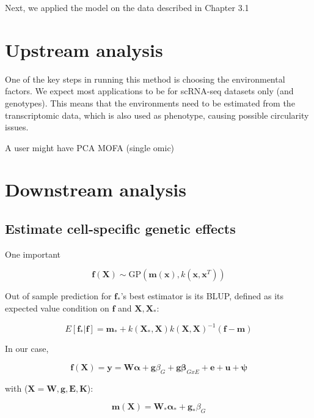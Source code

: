 Next, we applied the model on the data described in Chapter 3.1

\section{Upstream analysis}

One of the key steps in running this method is choosing the environmental factors.
We expect most applications to be for scRNA-seq datasets only (and genotypes).
This means that the environments need to be estimated from the transcriptomic data, which is also used as phenotype, causing possible circularity issues.


A user might have 
PCA
MOFA (single omic)

\section{Downstream analysis} 

\subsection{Estimate cell-specific genetic effects}
One important 

\begin{equation}
    \mathbf{f}(\mathbf{X}) \sim \mathrm{GP}(\mathbf{m}(\mathbf{x}), k(\mathbf{x},\mathbf{x}^T))
\end{equation}

Out of sample prediction for $\mathbf{f}_*$'s best estimator is its BLUP, defined as its expected value condition on $\mathbf{f}$ and $\mathbf{X},\mathbf{X}_*$:

\begin{equation}
    E[\mathbf{f}_*|\mathbf{f}] = \mathbf{m}_* +k(\mathbf{X}_*,\mathbf{X})k(\mathbf{X},\mathbf{X})^{-1}(\mathbf{f}-\mathbf{m})
\end{equation}

In our case,

\begin{equation}
    \mathbf{f}(\mathbf{X}) = \mathbf{y} = \mathbf{W}\boldsymbol{\alpha}+\mathbf{g}\beta_G+\mathbf{g}\boldsymbol{\beta}_{GxE}+\mathbf{e} + \mathbf{u} + \boldsymbol{\psi}
\end{equation}

with ($\mathbf{X} = {\mathbf{W},\mathbf{g},\mathbf{E},\mathbf{K}}$):

\begin{equation}
    \mathbf{m}(\mathbf{X}) = \mathbf{W}_*\boldsymbol{\alpha}_{*}+\mathbf{g}_*\beta_G
\end{equation}

